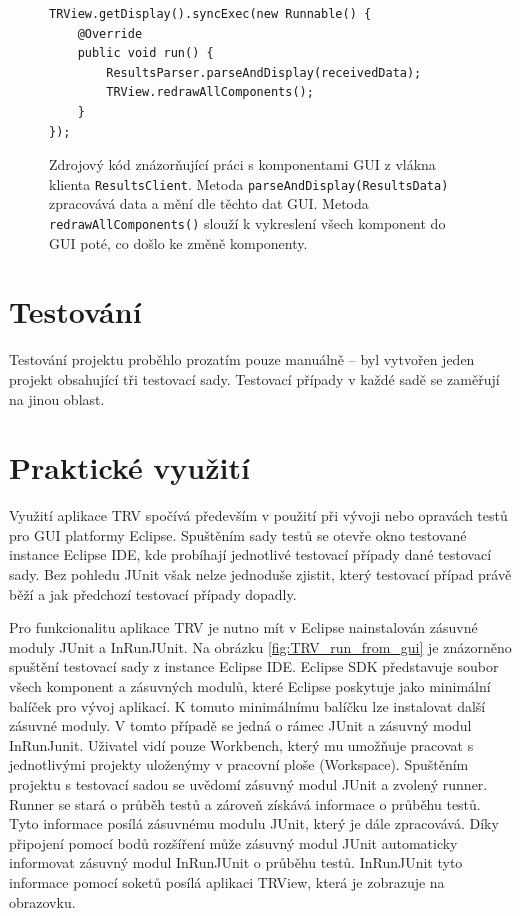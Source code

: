       	\lstset{language=java}
	\begin{figure}[h]
	  \begin{lstlisting}[frame=single]
TRView.getDisplay().syncExec(new Runnable() {
	@Override
	public void run() {
		ResultsParser.parseAndDisplay(receivedData);
		TRView.redrawAllComponents();
	}
});
	  \end{lstlisting}
	  \caption{Zdrojový kód znázorňující práci s komponentami GUI z vlákna klienta \texttt{ResultsClient}. Metoda \texttt{parseAndDisplay(ResultsData)} zpracovává data a mění dle těchto dat GUI. Metoda \texttt{redrawAllComponents()} slouží k vykreslení všech komponent do GUI poté, co došlo ke změně komponenty.}
	  \label{code:syncExec}
	\end{figure}
      
      
      
  \section{Testování}
  Testování projektu proběhlo prozatím pouze manuálně -- byl vytvořen jeden projekt obsahující tři testovací sady. Testovací případy v každé sadě se zaměřují na jinou oblast. 

  \section{Praktické využití}
  Využití aplikace TRV spočívá především v použití při vývoji nebo opravách testů pro GUI platformy Eclipse. Spuštěním sady testů se otevře okno testované instance Eclipse IDE, kde probíhají jednotlivé testovací případy dané testovací sady. Bez pohledu JUnit však nelze jednoduše zjistit, který testovací případ právě běží a jak předchozí testovací případy dopadly.
  
  Pro funkcionalitu aplikace TRV je nutno mít v Eclipse nainstalován zásuvné moduly JUnit a InRunJUnit. Na obrázku \ref{fig:TRV_run_from_gui} je znázorněno spuštění testovací sady z instance Eclipse IDE. Eclipse SDK představuje soubor všech komponent a zásuvných modulů, které Eclipse poskytuje jako minimální balíček pro vývoj aplikací. K tomuto minimálnímu balíčku lze instalovat další zásuvné moduly. V tomto případě se jedná o rámec JUnit a zásuvný modul InRunJunit. Uživatel vidí pouze Workbench, který mu umožňuje pracovat s jednotlivými projekty uloženýmy v pracovní ploše (Workspace). Spuštěním projektu s testovací sadou se uvědomí zásuvný modul JUnit a zvolený runner. Runner se stará o průběh testů a zároveň získává informace o průběhu testů. Tyto informace posílá zásuvnému modulu JUnit, který je dále zpracovává. Díky připojení pomocí bodů rozšíření může zásuvný modul JUnit automaticky informovat zásuvný modul InRunJUnit o průběhu testů. InRunJUnit tyto informace pomocí soketů posílá aplikaci TRView, která je zobrazuje na obrazovku.  
      
